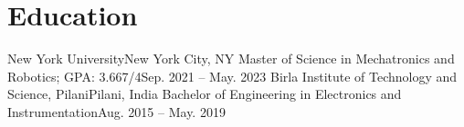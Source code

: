 \section{Education}
  \resumeSubHeadingListStart
    \resumeSubheading
      {New York University}{New York City, NY}
      {Master of Science in Mechatronics and Robotics;  GPA: 3.667/4}{Sep. 2021 -- May. 2023}
    \resumeSubheading
      {Birla Institute of Technology and Science, Pilani}{Pilani, India}
      {Bachelor of Engineering in Electronics and Instrumentation}{Aug. 2015 -- May. 2019}
  \resumeSubHeadingListEnd